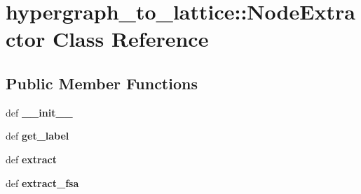 \hypertarget{classhypergraph__to__lattice_1_1NodeExtractor}{
\section{hypergraph\_\-to\_\-lattice::NodeExtractor Class Reference}
\label{classhypergraph__to__lattice_1_1NodeExtractor}
}
\subsection*{Public Member Functions}
\begin{DoxyCompactItemize}
\item 
\hypertarget{classhypergraph__to__lattice_1_1NodeExtractor_a65c0ff2e2fb202dc2b7d996786658733}{
def {\bfseries \_\-\_\-init\_\-\_\-}}
\label{classhypergraph__to__lattice_1_1NodeExtractor_a65c0ff2e2fb202dc2b7d996786658733}

\item 
\hypertarget{classhypergraph__to__lattice_1_1NodeExtractor_aebfb872a1dafa22a6dd3c2f8300c07d2}{
def {\bfseries get\_\-label}}
\label{classhypergraph__to__lattice_1_1NodeExtractor_aebfb872a1dafa22a6dd3c2f8300c07d2}

\item 
\hypertarget{classhypergraph__to__lattice_1_1NodeExtractor_a1ef5e5e0ec358b1ce7511dae70e63bdf}{
def {\bfseries extract}}
\label{classhypergraph__to__lattice_1_1NodeExtractor_a1ef5e5e0ec358b1ce7511dae70e63bdf}

\item 
\hypertarget{classhypergraph__to__lattice_1_1NodeExtractor_a7867888348ccd9044f34f242698c55f7}{
def {\bfseries extract\_\-fsa}}
\label{classhypergraph__to__lattice_1_1NodeExtractor_a7867888348ccd9044f34f242698c55f7}

\end{DoxyCompactItemize}
